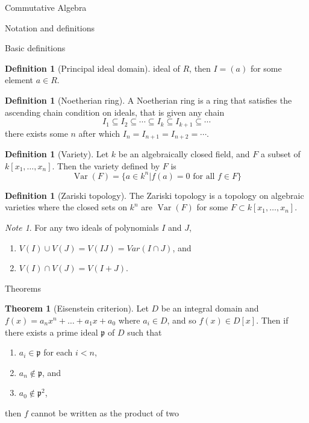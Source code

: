 \documentclass{article}
\theoremstyle{definition}
\newtheorem{theorem}{Theorem}
\numberwithin{theorem}{subsection} %
\theoremstyle{remark}
\newtheorem*{remark}{Note}
\theoremstyle{definition}
\newtheorem{definition}[paragraph]{Definition}
\newcommand{\Var}{\operatorname{Var}}
\newcommand{\set}[1]{\{#1\}}
\begin{document}
\begin{section}{Commutative Algebra}
\begin{subsection}{Notation and definitions}
\begin{subsubsection}{Basic definitions}
\begin{definition}[Principal ideal domain]
        ideal of $R$, then $I = (a)$ for some element $a \in R$.
      \end{definition}
      \begin{definition}[Noetherian ring]
        A Noetherian ring is a ring that satisfies the ascending chain condition
        on ideals, that is given any chain \[
          I_1 \subseteq I_2 \subseteq \cdots \subseteq I_k \subseteq I_{k+1} \subseteq \cdots
        \] there exists some $n$ after which $I_n = I_{n+1} = I_{n+2} = \cdots$.
      \end{definition}
      \begin{definition}[Variety]
        Let $k$ be an algebraically closed field, and $F$ a subset of $k[x_1, \hdots, x_n]$.
        Then the variety defined by $F$ is \[
          \Var(F) = \set{a \in k^n | f(a) = 0 \text{ for all } f \in F}
        \]
      \end{definition}
      \begin{definition}[Zariski topology]
        The Zariski topology is a topology on algebraic varieties where the
        closed sets on $k^n$ are $\Var(F)$ for some $F \subset k[x_1, \hdots, x_n]$.
      \end{definition}
      \begin{remark}
        For any two ideals of polynomials $I$ and $J$, \begin{enumerate}
          \item $V(I) \cup V(J) = V(IJ) = Var(I \cap J)$, and
          \item $V(I) \cap V(J) = V(I + J)$.
        \end{enumerate}
      \end{remark}
    \end{subsubsection}
  \end{subsection}
  \begin{subsection}{Theorems}
    \begin{theorem}[Eisenstein criterion]
      Let $D$ be an integral domain and $f(x) = a_nx^n + \hdots + a_1x + a_0$
      where $a_i \in D$, and so $f(x) \in D[x]$. Then if there exists a prime
      ideal $\mathfrak p$ of $D$ such that \begin{enumerate}
        \item $a_i \in \mathfrak p$ for each $i < n$,
        \item $a_n \not\in \mathfrak p$, and
        \item $a_0 \not\in \mathfrak p^2$,
      \end{enumerate} then $f$ cannot be written as the product of two

\end{theorem}
\end{subsection}
\end{section}
\end{document}
